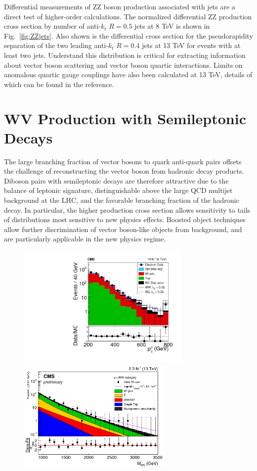 \documentclass[10pt]{article}
\begin{document}
Differential measurements of ZZ boson production associated with jets are
a direct test of higher-order calculations. The normalized differential 
ZZ production cross section by number of anti-$k_{t}$ $R=0.5$ jets 
at 8 TeV is shown in Fig.~\ref{fig:ZZjets}. Also shown is the differential
cross section for the pseudorapidity separation of the two leading
anti-$k_{t}$ $R=0.4$ jets at 13 TeV for events with at least two jets.
Understand this distribution is critical for extracting information
about vector boson scattering and vector boson quartic interactions.
Limits on anomalous quartic gauge couplings have also been calculated at 13 TeV, 
details of which can be found in the reference.

\section{WV Production with Semileptonic Decays}

The large branching fraction 
of vector bosons to quark anti-quark pairs offsets
the challenge of reconstructing the vector boson from
hadronic decay products. Diboson pairs with semileptonic decays
are therefore attractive due to the balance of leptonic signature, 
distinguishable above the large QCD multijet background at the LHC,
and the favorable branching fraction of the hadronic decay.
In particular, the higher production cross section
allows sensitivity to tails of distributions most sensitive to new physics
effects. Boosted object techniques allow further discrimination of
vector boson-like objects from background, and are particularly applicable
in the new physics regime.

\begin{figure}[htb]
  \centering
    \includegraphics[height=2.35in]{figures/WV8TeV_ptJ_aC.png}
    \includegraphics[height=2.15in]{figures/WV13TeV_mWW_aC.png}
  \caption{ }
  \label{fig:WV}
\end{figure}
\end{document}

